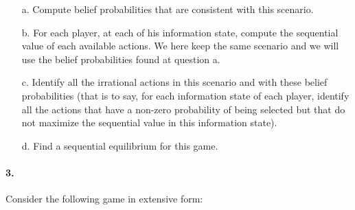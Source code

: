 \documentclass[a4paper,notitlepage,12pt]{article}
\begin{document}
\begin{center}
\end{center}

\newpage
\begin{enumerate}
	\item[a.] Compute belief probabilities that are consistent with this scenario.
	\item[b.] For each player, at each of his information state, compute the sequential value of each available actions. We here keep the same scenario and we will use the belief probabilities found at question a.
	\item[c.] Identify all the irrational actions in this scenario and with these belief probabilities (that is to say, for each information state of each player, identify all the actions that have a non-zero probability of being selected but that do not maximize the sequential value in this information state).
	\item[d.] Find a sequential equilibrium for this game.
\end{enumerate}

\paragraph{3. } Consider the following game in extensive form:
\end{document}
